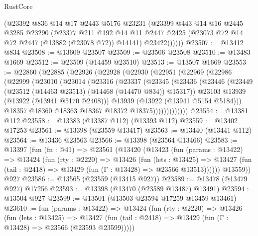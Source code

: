 \begin{lexlean}{RustCore}
\begin{coremodule}
          (@23392
            @836
            @14
            @17
            @2443
            @5176
            @23231
            (@23399
              @443
              @14
              @16
              @2445
              @3285
              @23290
              (@23377
                @211
                @192
                @14
                @11
                @2447
                @2425
                (@23073 @72 @14 @72 @2447 (@13882 (@23078 @72)) @14141)
                @23422))))))
@23507 := @13412 @834
@23508 := @13609 @23507
@23509 := @23506 @23508
@23510 := @13483 @1669
@23512 := @23509 (@14459 @23510)
@23513 := @13507 @1669
@23553 := @22860
    (@22885
      (@22926
        (@22928
          (@22930
            (@22951
              (@22969
                (@22986
                  (@22999
                    (@23010
                      (@23014
                        (@23316
                          (@23337
                            (@23345
                              (@23436
                                (@23446
                                  (@23449 (@23512 (@14463 @23513) (@14468 (@14470 @834)) @15317))
                                  @23103
                                  @13939
                                  (@13922 (@13941 @5170 @2408)))
                                @13939
                                (@13922 (@13941 @5154 @5184)))
                              @18357
                              @18360
                              @18363
                              @18367
                              @18372
                              @18375)))))))))))))
@23554 := @13381 @112
@23558 := @13383 (@13387 @112) (@13393 @112)
@23559 := @13402 @17253
@23561 := @13398 (@23559 @13417)
@23563 := @13440 (@13441 @112)
@23564 := @13436 @23563
@23566 := @13398 (@23564 @13466)
@23583 := @13397
    (fun (fn : @41) =>
    @23561
      (@13420
        (@13423
          (fun (params : @13422) =>
          @13424
            (fun (rty : @2220) =>
            @13426
              (fun (lets : @13425) =>
              @13427 (fun (tail : @2418) => @13429 (fun (Γ : @13428) => @23566 @13513))))))
        @13559))
    @927
@23586 := @13565 (@23559 (@13415 @927))
@23589 := @13478 (@13479 @927) @17256
@23593 := @13398 (@13470 (@23589 @13487) @13491)
@23594 := @13504 @927
@23599 := @13501 (@13503 @23594 @17259 @13459 @13461)
@23610 := fun (params : @13422) =>
  @13424
    (fun (rty : @2220) =>
    @13426
      (fun (lets : @13425) =>
      @13427 (fun (tail : @2418) => @13429 (fun (Γ : @13428) => @23566 (@23593 @23599)))))

\end{coremodule}
\end{lexlean}
